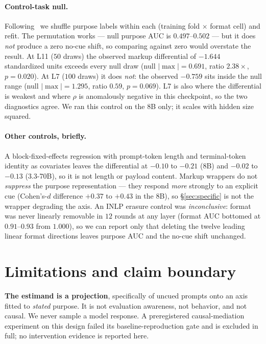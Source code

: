\documentclass[10pt]{article}
\begin{document}
\paragraph{Control-task null.} Following~\cite{hewitt2019} we shuffle purpose
labels within each (training fold $\times$ format cell) and refit. The
permutation works --- null purpose AUC is $0.497$--$0.502$ --- but it does
\emph{not} produce a zero no-cue shift, so comparing against zero would overstate
the result. At L11 ($50$ draws) the observed markup differential of $-1.644$
standardized units exceeds every null draw (null $|{\max}| = 0.691$, ratio
$2.38\times$, $p = 0.020$). At L7 ($100$ draws) it does \emph{not}: the observed
$-0.759$ sits inside the null range (null $|{\max}| = 1.295$, ratio $0.59$,
$p = 0.069$). L7 is also where the differential is weakest and where $\rho$ is
anomalously negative in this checkpoint, so the two diagnostics agree. We ran
this control on the 8B only; it scales with hidden size squared.

\paragraph{Other controls, briefly.} A block-fixed-effects regression with
prompt-token length and terminal-token identity as covariates leaves the
differential at $-0.10$ to $-0.21$ (8B) and $-0.02$ to $-0.13$ (3.3-70B), so it
is not length or payload content. Markup wrappers do not \emph{suppress} the
purpose representation --- they respond \emph{more} strongly to an explicit cue
(Cohen's-$d$ difference $+0.37$ to $+0.43$ in the 8B), so \S\ref{sec:specific} is
not the wrapper degrading the axis. An INLP erasure control was
\emph{inconclusive}: format was never linearly removable in $12$ rounds at any
layer (format AUC bottomed at $0.91$--$0.93$ from $1.000$), so we can report only
that deleting the twelve leading linear format directions leaves purpose AUC and
the no-cue shift unchanged.

\section{Limitations and claim boundary}

\textbf{The estimand is a projection}, specifically of uncued prompts onto an
axis fitted to \emph{stated} purpose. It is not evaluation awareness, not
behavior, and not causal. We never sample a model response. A preregistered
causal-mediation experiment on this design failed its baseline-reproduction gate
and is excluded in full; no intervention evidence is reported here.
\end{document}

